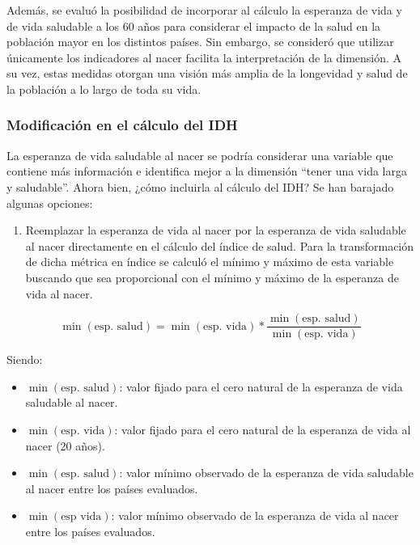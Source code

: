 \documentclass[
  10pt,
]{article}
\providecommand{\tightlist}{%
  \setlength{\itemsep}{0pt}\setlength{\parskip}{0pt}}
\begin{document}
Además, se evaluó la posibilidad de incorporar al cálculo la esperanza
de vida y de vida saludable a los 60 años para considerar el impacto de
la salud en la población mayor en los distintos países. Sin embargo, se
consideró que utilizar únicamente los indicadores al nacer facilita la
interpretación de la dimensión. A su vez, estas medidas otorgan una
visión más amplia de la longevidad y salud de la población a lo largo de
toda su vida.

\subsubsection{Modificación en el cálculo del
IDH}\label{modificaciuxf3n-en-el-cuxe1lculo-del-idh}

La esperanza de vida saludable al nacer se podría considerar una
variable que contiene más información e identifica mejor a la dimensión
``tener una vida larga y saludable''. Ahora bien, ¿cómo incluirla al
cálculo del IDH? Se han barajado algunas opciones:

\begin{enumerate}
\def\labelenumi{\arabic{enumi}.}
\tightlist
\item
  Reemplazar la esperanza de vida al nacer por la esperanza de vida
  saludable al nacer directamente en el cálculo del índice de salud.
  Para la transformación de dicha métrica en índice se calculó el mínimo
  y máximo de esta variable buscando que sea proporcional con el mínimo
  y máximo de la esperanza de vida al nacer.
\end{enumerate}

\[\min(\text{esp. salud}) = \min(\text{esp. vida})*\frac{\min(\text{esp. salud})}{\min(\text{esp. vida})}\]

Siendo:

\begin{itemize}
\item
  \(\min(\text{esp. salud})\): valor fijado para el cero natural de la
  esperanza de vida saludable al nacer.
\item
  \(\min(\text{esp. vida})\): valor fijado para el cero natural de la
  esperanza de vida al nacer (20 años).
\item
  \(\min(\text{esp. salud})\): valor mínimo observado de la esperanza de
  vida saludable al nacer entre los países evaluados.
\item
  \(\min(\text{esp vida})\): valor mínimo observado de la esperanza de
  vida al nacer entre los países evaluados.
\end{itemize}
\end{document}
